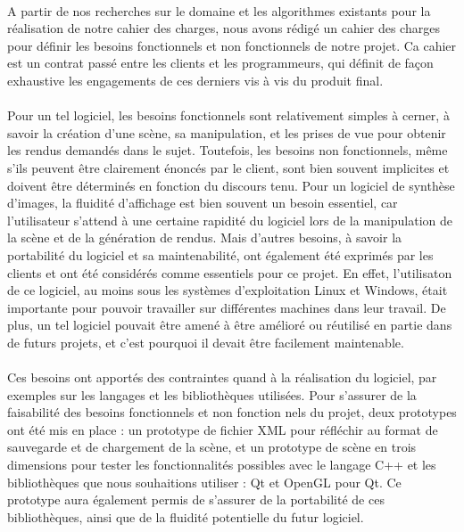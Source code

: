 \paragraph{}
        A partir de nos recherches sur le domaine et les algorithmes existants pour la réalisation de notre cahier des charges, nous avons rédigé un cahier des charges pour définir les besoins fonctionnels et non fonctionnels de notre projet. Ca cahier est un contrat passé entre les clients et les programmeurs, qui définit de façon exhaustive les engagements de ces derniers vis à vis du produit final.

\paragraph{}
        Pour un tel logiciel, les besoins fonctionnels sont relativement simples à cerner, à savoir la création d'une scène, sa manipulation, et les prises de vue pour obtenir les rendus demandés dans le sujet. 
        Toutefois, les besoins non fonctionnels, même s'ils peuvent être clairement énoncés par le client, sont bien souvent implicites et doivent être déterminés en fonction du discours tenu. Pour un logiciel de synthèse d'images, la fluidité d'affichage est bien souvent un besoin essentiel, car l'utilisateur s'attend à une certaine rapidité du logiciel lors de la manipulation de la scène et de la génération de rendus. 
        Mais d'autres besoins, à savoir la portabilité du logiciel et sa maintenabilité, ont également été exprimés par les clients et ont été considérés comme essentiels pour ce projet. En effet, l'utilisaton de ce logiciel, au moins sous les systèmes d'exploitation Linux et Windows, était importante pour pouvoir travailler sur différentes machines dans leur travail. 
        De plus, un tel logiciel pouvait être amené à être amélioré ou réutilisé en partie dans de futurs projets, et c'est pourquoi il devait être facilement maintenable.

\paragraph{}
        Ces besoins ont apportés des contraintes quand à la réalisation du logiciel, par exemples sur les langages et les bibliothèques utilisées.
            Pour s'assurer de la faisabilité des besoins fonctionnels et non fonction    nels du projet, deux prototypes ont été mis en place : un prototype de fichier XML pour réfléchir au format de sauvegarde et de chargement de la scène, et un prototype de scène en trois dimensions pour tester les fonctionnalités possibles avec le langage C++ et les bibliothèques que nous souhaitions utiliser : Qt et OpenGL pour Qt. Ce prototype aura également permis de s'assurer de la portabilité de ces bibliothèques, ainsi que de la fluidité potentielle du futur logiciel.

